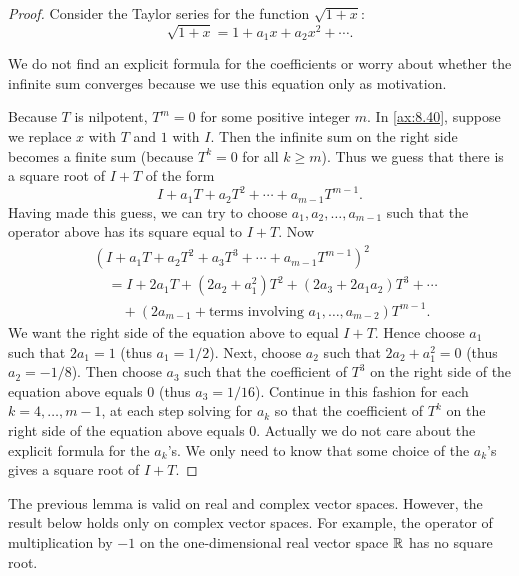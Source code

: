 \begin{proof}
Consider the Taylor series for the function
$\sqrt{1+x}$:\label{ax:8.40}
\[ \sqrt{1+x} = 1 + a_1x + a_2x^2 + \cdots. \tag{\thetheorem} \]

%
We do not find an explicit formula for the coefficients or worry about whether
the infinite sum converges because we use this equation only as motivation.

Because $T$ is nilpotent, $T^m=0$ for some positive integer $m$. In
\ref{ax:8.40}, suppose we replace $x$ with $T$ and $1$ with $I$. Then the
infinite sum on the right side becomes a finite sum (because $T^k=0$ for all
$k\ge m$). Thus we guess that there is a square root of $I+T$ of the form
\[ I + a_1T + a_2T^2 + \cdots + a_{m-1}T^{m-1}. \]
Having made this guess, we can try to choose $a_1,a_2,\dots,a_{m-1}$ such that
the operator above has its square equal to $I+T$. Now
\begin{align*}
&(I + a_1T + a_2T^2 + a_3T^3 + \cdots + a_{m-1}T^{m-1})^2\\
&\quad= I + 2a_1T + (2a_2+a_1^2)T^2 + (2a_3+2a_1a_2)T^3 + \cdots\\
&\qquad+ (2a_{m-1} + \text{terms involving } a_1,\dots,a_{m-2})T^{m-1}.
\end{align*}
We want the right side of the equation above to equal $I+T$. Hence choose $a_1$
such that $2a_1=1$ (thus $a_1=1/2$). Next, choose $a_2$ such that
$2a_2+a_1^2=0$ (thus $a_2=-1/8$). Then choose $a_3$ such that the coefficient
of $T^3$ on the right side of the equation above equals $0$ (thus
$a_3=1/16$). Continue in this fashion for each $k=4,\dots,m-1$, at each step
solving for $a_k$ so that the coefficient of $T^k$ on the right side of the
equation above equals $0$. Actually we do not care about the explicit formula
for the $a_k$'s. We only need to know that some choice of the $a_k$'s gives a
square root of $I+T$.
\end{proof}

The previous lemma is valid on real and complex vector spaces. However, the
result below holds only on complex vector spaces. For example, the operator of
multiplication by $-1$ on the one-dimensional real vector space $\mathbb{R}$ has no
square root.

